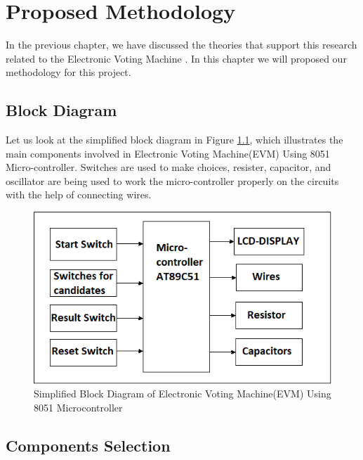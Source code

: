 \chapter{Proposed Methodology}
\label{chap3}
In the previous chapter, we have discussed the theories that support this research related to the Electronic Voting Machine . In this chapter we will proposed our methodology for this project.
\section{Block Diagram}
Let us look at the simplified block diagram in Figure \ref{blockDiagram}, which illustrates the main components involved
in Electronic Voting Machine(EVM) Using 8051 Micro-controller. Switches are used to make choices, resister, capacitor, and oscillator are being used to work the micro-controller properly on the circuits with the help of connecting wires.
\begin{figure}[H]  %
\begin{center}
\includegraphics[scale=0.80]{Chapter3/blockDiagram}
\caption{Simplified Block Diagram of Electronic Voting Machine(EVM) Using 8051 Microcontroller}
\label{blockDiagram}
\end{center}
\end{figure}


\section{Components Selection}
